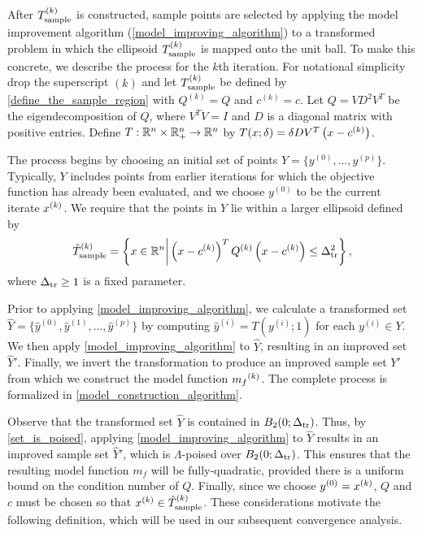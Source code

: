 \documentclass{article}
\begin{document}
After  ${T_{\text{sample}}^{(k)}}$ is constructed,  sample points are selected by applying the model improvement algorithm  (\cref{model_improving_algorithm}) 
to a transformed problem in which the ellipsoid ${T_{\text{sample}}^{(k)}}$ is mapped onto the unit ball.   
To make this concrete,  we describe the process for the $k$th iteration.  For notational simplicity drop the superscript $(k)$ and let ${T_{\text{sample}}^{(k)}}$ be defined by \cref{define_the_sample_region} with $Q^{(k)}=Q$ and $c^{(k)}=c$.     
Let $Q= V D^2 V^T$ be the eigendecomposition  of $Q$, where $V^TV = I$ and $D$ is a diagonal matrix with positive entries.  Define
$T:\mathbb R^n \times \mathbb R^n_+ \rightarrow \mathbb R^n$ by $T(x; \delta) = \delta DV^T\left(x - c^{(k)}\right)$.

The process begins by choosing an initial set of points $Y=\{y^{(0)}, \ldots,  y^{(p)}\}$.       Typically, $Y$ includes points from earlier iterations for which the objective function has already been evaluated, and we choose $y^{(0)}$ to be  the current iterate $x^{(k)}$.     We require that the points in $Y$ lie within a larger ellipsoid defined by
\begin{equation}
\label{define_the_sample_region}
{\hat{T}_{\text{sample}}^{(k)}} = \left\{x \in \mathbb R^n \bigg | \left(x - c^{(k)}\right)^T {Q^{(k)}} \left(x - c^{(k)}\right) \le \Delta_{\textrm{tr}}^2 \right\},
\end{equation}
where $\Delta_{\textrm{tr}} \ge 1$ is a fixed parameter.

Prior to applying \cref{model_improving_algorithm},  we calculate a transformed set $\hat{Y}=\{\hat{y}^{(0)}, \hat{y}^{(1)},\ldots,\hat{y}^{(p)}\}$ by computing $\hat{y}^{(i)} = T(y^{(i)};1)$ for each $y^{(i)} \in Y$.    We then apply \cref{model_improving_algorithm} to $\hat{Y}$, resulting in an improved set $\hat{Y}'$.  Finally, we invert the transformation to produce an improved sample set $Y'$ from which we construct the model function ${{m}_f}^{(k)}$.  
The complete process is formalized in \cref{model_construction_algorithm}.

Observe that the transformed set $\hat{Y}$ is contained in $B_2(0;\Delta_{\textrm{tr}})$.  Thus,   by \cref{set_is_poised}, applying 
\cref{model_improving_algorithm} to $\hat{Y}$ results in an improved sample set $\hat{Y}'$, which is $\Lambda$-poised over $B_2(0; \Delta_{\textrm{tr}})$.    This ensures that the resulting model function $m_f$ will be fully-quadratic, provided there is a uniform bound on the condition number of $Q$.    Finally, since we choose $y^{(0)} = x^{(k)}$,  $Q$ and $c$ must be chosen so that $x^{(k)} \in  {\hat{T}_{\text{sample}}^{(k)}}$.  These considerations motivate the following definition, which will be used in our subsequent convergence analysis.
\end{document}
